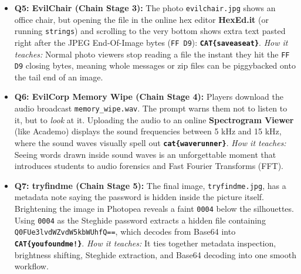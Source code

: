 \documentclass[11pt,a4paper]{article}
\begin{document}
\begin{itemize}
    \item \textbf{Q5: EvilChair (Chain Stage 3):} The photo \texttt{evilchair.jpg} shows an office chair, but opening the file in the online hex editor \textbf{HexEd.it} (or running \texttt{strings}) and scrolling to the very bottom shows extra text pasted right after the JPEG End-Of-Image bytes (\texttt{FF D9}): \textbf{\texttt{CAT\{saveaseat\}}}. \textit{How it teaches:} Normal photo viewers stop reading a file the instant they hit the \texttt{FF D9} closing bytes, meaning whole messages or zip files can be piggybacked onto the tail end of an image.
    \item \textbf{Q6: EvilCorp Memory Wipe (Chain Stage 4):} Players download the audio broadcast \texttt{memory\_wipe.wav}. The prompt warns them not to listen to it, but to \textit{look} at it. Uploading the audio to an online \textbf{Spectrogram Viewer} (like Academo) displays the sound frequencies between 5 kHz and 15 kHz, where the sound waves visually spell out \textbf{\texttt{cat\{waverunner\}}}. \textit{How it teaches:} Seeing words drawn inside sound waves is an unforgettable moment that introduces students to audio forensics and Fast Fourier Transforms (FFT).
    \item \textbf{Q7: tryfindme (Chain Stage 5):} The final image, \texttt{tryfindme.jpg}, has a metadata note saying the password is hidden inside the picture itself. Brightening the image in Photopea reveals a faint \texttt{0004} below the silhouettes. Using \texttt{0004} as the Steghide password extracts a hidden file containing \texttt{Q0FUe3lvdWZvdW5kbWUhfQ==}, which decodes from Base64 into \textbf{\texttt{CAT\{youfoundme!\}}}. \textit{How it teaches:} It ties together metadata inspection, brightness shifting, Steghide extraction, and Base64 decoding into one smooth workflow.
\end{itemize}
\end{document}
